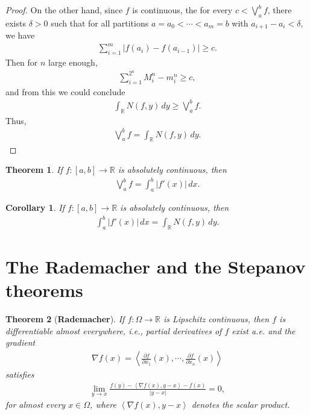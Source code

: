 \documentclass[11pt]{book}
\newtheorem{theorem}{Theorem}[chapter]
\newtheorem{corollary}{Corollary}[theorem]
\theoremstyle{definition}
\numberwithin{equation}{chapter}
\begin{document}
\begin{proof}
On the other hand, since $f$ is continuous, the for every $c < \bigvee^b_a f$, there exists $\delta > 0$ such that for all partitions $a = a_0 < \cdots < a_m = b$ with $a_{i+1} - a_i < \delta$, we have
\begin{align*}
    \sum^m_{i=1} \left|f(a_i) - f(a_{i-1})\right| \geq c.
\end{align*}
Then for $n$ large enough, 
\begin{align*}
    \sum^{2^n}_{i=1} M_i^n - m_i^n \geq c,
\end{align*}
and from this we could conclude
\begin{align*}
    \int_{\mathbb{R}} N(f,y)\,dy \geq \bigvee^b_a f.
\end{align*}
Thus, 
\begin{align*}
    \bigvee^b_a f = \int_{\mathbb{R}} N(f,y) \,dy.
\end{align*}
\end{proof}

\medskip

\begin{theorem}
If $f:[a,b] \to \mathbb{R}$ is absolutely continuous, then 
\begin{align*}
    \bigvee^b_a f = \int^b_a \left|f'(x)\right| \,dx.
\end{align*}
\end{theorem}

\medskip

\begin{corollary}
If $f:[a,b] \to \mathbb{R}$ is absolutely continuous, then 
\begin{align*}
    \int^b_a \left|f'(x)\right| \,dx = \int_{\mathbb{R}} N(f,y) \,dy.
\end{align*}
\end{corollary}

\medskip

\section{The Rademacher and the Stepanov theorems}

\begin{theorem}[{\bf Rademacher}]\label{theorem_617}
If $f: \Omega \to \mathbb{R}$ is Lipschitz continuous, then $f$ is differentiable almost everywhere, i.e., partial derivatives of $f$ exist a.e. and the gradient
\begin{align*}
    \nabla f(x) = \left\langle \frac{\partial f}{\partial x_1}(x), \cdots, \frac{\partial f}{\partial x_n}(x) \right\rangle
\end{align*}
satisfies
\begin{align*}
    \lim_{y\to x} \frac{f(y) - \left\langle \nabla f(x), y - x \right\rangle - f(x)}{\left|y - x\right|} = 0,
\end{align*}
for almost every $x \in \Omega$, where $\left\langle \nabla f(x), y - x \right\rangle$ denotes the scalar product.
\end{theorem}
\end{document}
